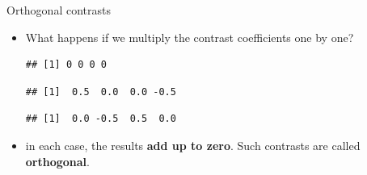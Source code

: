 \begin{frame}[fragile]{Orthogonal contrasts}
  
  \begin{itemize}
  \item What happens if we multiply the contrast coefficients one by one?
\begin{knitrout}
\color{fgcolor}\begin{kframe}
\begin{alltt}
\hlopt{*}
\end{alltt}
\begin{verbatim}
## [1] 0 0 0 0
\end{verbatim}
\begin{alltt}
\hlopt{*}
\end{alltt}
\begin{verbatim}
## [1]  0.5  0.0  0.0 -0.5
\end{verbatim}
\begin{alltt}
\hlopt{*}
\end{alltt}
\begin{verbatim}
## [1]  0.0 -0.5  0.5  0.0
\end{verbatim}
\end{kframe}
\end{knitrout}
\item in each case, the results \textbf{add up to zero}. Such
  contrasts are called \textbf{orthogonal}.

  \end{itemize}
  
\end{frame}


